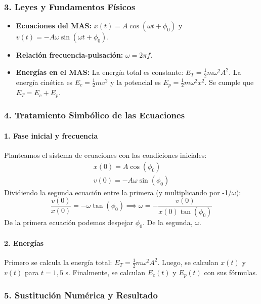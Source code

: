 \subsubsection*{3. Leyes y Fundamentos Físicos}
\begin{itemize}
    \item \textbf{Ecuaciones del MAS:} $x(t) = A\cos(\omega t + \phi_0)$ y $v(t) = -A\omega\sin(\omega t + \phi_0)$.
    \item \textbf{Relación frecuencia-pulsación:} $\omega = 2\pi f$.
    \item \textbf{Energías en el MAS:} La energía total es constante: $E_T = \frac{1}{2}m\omega^2A^2$. La energía cinética es $E_c = \frac{1}{2}mv^2$ y la potencial es $E_p = \frac{1}{2}m\omega^2x^2$. Se cumple que $E_T=E_c+E_p$.
\end{itemize}

\subsubsection*{4. Tratamiento Simbólico de las Ecuaciones}
\paragraph{1. Fase inicial y frecuencia}
Planteamos el sistema de ecuaciones con las condiciones iniciales:
\begin{gather}
    x(0) = A\cos(\phi_0) \\
    v(0) = -A\omega\sin(\phi_0)
\end{gather}
Dividiendo la segunda ecuación entre la primera (y multiplicando por -1/$\omega$):
$$ \frac{v(0)}{x(0)} = -\omega\tan(\phi_0) \implies \omega = -\frac{v(0)}{x(0)\tan(\phi_0)} $$
De la primera ecuación podemos despejar $\phi_0$. De la segunda, $\omega$.
\paragraph{2. Energías}
Primero se calcula la energía total: $E_T = \frac{1}{2}m\omega^2A^2$.
Luego, se calculan $x(t)$ y $v(t)$ para $t=1,5$ s.
Finalmente, se calculan $E_c(t)$ y $E_p(t)$ con sus fórmulas.

\subsubsection*{5. Sustitución Numérica y Resultado}
